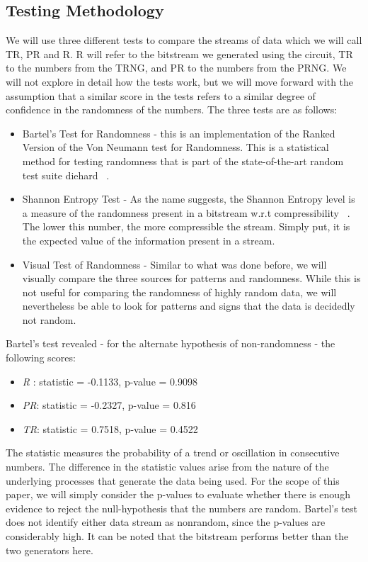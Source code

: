 \documentclass[jou,apacite]{apa6}
\begin{document}
\subsection{Testing Methodology}
We will use three different tests to compare the streams of data which we will call TR, PR and R. R will refer to the bitstream we generated using the circuit, TR to the numbers from the TRNG, and PR to the numbers from the PRNG. We will not explore in detail how the tests work, but we will move forward with the assumption that a similar score in the tests refers to a similar degree of confidence in the randomness of the numbers. The three tests are as follows:

\begin{itemize}
\item Bartel's Test for Randomness - this is an implementation of the Ranked Version of the Von Neumann test for Randomness. This is a statistical method for testing randomness that is part of the state-of-the-art random test suite diehard ~\cite{bart}.
\item Shannon Entropy Test - As the name suggests, the Shannon Entropy level is a measure of the randomness present in a bitstream w.r.t compressibility ~\cite{shan}. The lower this number, the more compressible the stream. Simply put, it is the expected value of the information present in a stream.
\item Visual Test of Randomness - Similar to what was done before, we will visually compare the three sources for patterns and randomness. While this is not useful for comparing the randomness of highly random data, we will nevertheless be able to look for patterns and signs that the data is decidedly not random.
\end{itemize}

Bartel's test revealed - for the alternate hypothesis of non-randomness - the following scores:
\begin{itemize}
\item \emph{R} : statistic = -0.1133, p-value = 0.9098
\item \emph{PR}: statistic = -0.2327, p-value = 0.816
\item \emph{TR}: statistic = 0.7518, p-value = 0.4522
\end{itemize}
The statistic measures the probability of a trend or oscillation in consecutive numbers. The difference in the statistic values arise from the nature of the underlying processes that generate the data being used. For the scope of this paper, we will simply consider the p-values to evaluate whether there is enough evidence to reject the null-hypothesis that the numbers are random. Bartel's test does not identify either data stream as nonrandom, since the p-values are considerably high. It can be noted that the bitstream performs better than the two generators here. 
\end{document}
